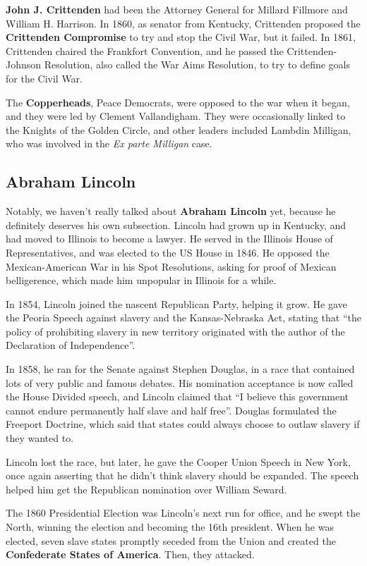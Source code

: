 \textbf{John J. Crittenden} had been the Attorney General for Millard Fillmore and William H. Harrison.
In 1860, as senator from Kentucky, Crittenden proposed the \textbf{Crittenden Compromise}
to try and stop the Civil War, but it failed.
In 1861, Crittenden chaired the Frankfort Convention,
and he passed the Crittenden-Johnson Resolution, also called the War Aims Resolution,
to try to define goals for the Civil War.

The \textbf{Copperheads}, Peace Democrats, were opposed to the war when it began,
and they were led by Clement Vallandigham.
They were occasionally linked to the Knights of the Golden Circle,
and other leaders included Lambdin Milligan, who was involved in the \textit{Ex parte Milligan} case.

\subsection*{Abraham Lincoln}

Notably, we haven't really talked about \textbf{Abraham Lincoln} yet,
because he definitely deserves his own subsection.
Lincoln had grown up in Kentucky, and had moved to Illinois to become a lawyer.
He served in the Illinois House of Representatives, and was elected to the US House in 1846.
He opposed the Mexican-American War in his Spot Resolutions, asking for proof of Mexican belligerence,
which made him unpopular in Illinois for a while.

In 1854, Lincoln joined the nascent Republican Party, helping it grow.
He gave the Peoria Speech against slavery and the Kansas-Nebraska Act, stating that
``the policy of prohibiting slavery in new territory originated with the author of the Declaration of Independence''.

In 1858, he ran for the Senate against Stephen Douglas,
in a race that contained lots of very public and famous debates.
His nomination acceptance is now called the House Divided speech, and Lincoln claimed that
``I believe this government cannot endure permanently half slave and half free''.
Douglas formulated the Freeport Doctrine,
which said that states could always choose to outlaw slavery if they wanted to.

Lincoln lost the race, but later, he gave the Cooper Union Speech in New York,
once again asserting that he didn't think slavery should be expanded.
The speech helped him get the Republican nomination over William Seward.

The 1860 Presidential Election was Lincoln's next run for office, and he swept the North,
winning the election and becoming the 16th president.
When he was elected, seven slave states promptly seceded from the Union
and created the \textbf{Confederate States of America}.
Then, they attacked.

